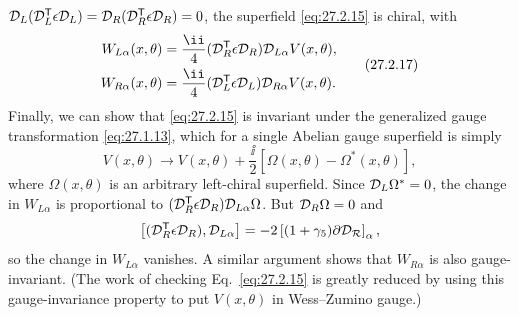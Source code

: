 \(\mathcal{D}_L(\mathcal{D}_L^{\mathsf T}\epsilon\mathcal{D}_L)
=\mathcal{D}_R(\mathcal{D}_R^{\mathsf T}\epsilon\mathcal{D}_R)=0\), the superfield
\eqref{eq:27.2.15} is chiral, with
\begin{equation}
  \begin{aligned}
  W_{L\alpha}(x,\theta)
  &=\frac{\ii}{4}(\SuperD_R^{\mathsf T}\epsilon\SuperD_R)
    \SuperD_{L\alpha}V(x,\theta),
  \\
  W_{R\alpha}(x,\theta)
  &=\frac{\ii}{4}(\SuperD_L^{\mathsf T}\epsilon\SuperD_L)
    \SuperD_{R\alpha}V(x,\theta).
  \end{aligned}
  \tag{27.2.17}\label{eq:27.2.17}
\end{equation}
Finally, we can show that \eqref{eq:27.2.15} is invariant under the
generalized gauge transformation \eqref{eq:27.1.13}, which for a single
Abelian gauge superfield is simply
\begin{equation}
  V(x,\theta)\longrightarrow
  V(x,\theta)+\frac{\ii}{2}
  \left[\Omega(x,\theta)-\Omega^*(x,\theta)\right],
  \tag{27.2.18}\label{eq:27.2.18}
\end{equation}
where \(\Omega(x,\theta)\) is an arbitrary left-chiral superfield. Since
\(\mathcal{D}_L\Omega^*=0\), the change in \(W_{L\alpha}\) is proportional to
\((\mathcal{D}_R^{\mathsf T}\epsilon\mathcal{D}_R)\mathcal{D}_{L\alpha}\Omega\). But
\(\mathcal{D}_R\Omega=0\) and
\[
  \left[(\mathcal{D}_R^{\mathsf T}\epsilon\mathcal{D}_R),\mathcal{D}_{L\alpha}\right]
  =-2\left[(1+\gamma_5)\sl{\partial}\mathcal{D}_R\right]_\alpha,
\]
so the change in \(W_{L\alpha}\) vanishes. A similar argument shows that
\(W_{R\alpha}\) is also gauge-invariant. (The work of checking
Eq.~\eqref{eq:27.2.15} is greatly reduced by using this gauge-invariance
property to put \(V(x,\theta)\) in Wess--Zumino gauge.)

